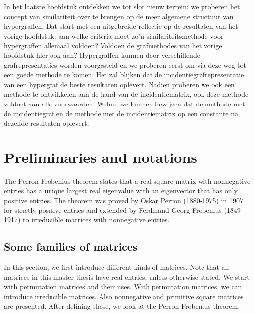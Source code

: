 \documentclass[a4paper,11pt]{report}
\begin{document}
In het laatste hoofdstuk ontdekken we tot slot nieuw terrein: we proberen 
het concept van similariteit over te brengen op de meer algemene 
structuur van hypergraffen. Dat start met een uitgebreide reflectie op de resultaten van het vorige hoofdstuk:
aan welke criteria moet zo'n similariteitsmethode voor hypergraffen allemaal voldoen? Voldoen de grafmethodes van het vorige
hoofdstuk hier ook aan? Hypergraffen kunnen door verschillende 
grafrepresentaties worden voorgesteld en we proberen eerst om via deze 
weg tot een goede methode te komen. Het zal blijken dat de incidentiegrafrepresentatie van een hypergraf de beste
resultaten oplevert. Nadien proberen 
we ook een methode te ontwikkelen aan de hand van de incidentiematrix, ook deze 
methode voldoet aan alle voorwaarden. Welnu: we kunnen bewijzen dat de methode 
met de incidentiegraf en de methode met de incidentiematrix op een constante na 
dezelfde resultaten oplevert.


 

\tableofcontents
\newpage
\chapter{Preliminaries and notations}


The Perron-Frobenius theorem states that a real square matrix with nonnegative entries has a unique largest real eigenvalue with an eigenvector 
that has only positive entries. The theorem was proved by Oskar 
Perron (1880-1975) in 1907 for strictly positive entries and extended by 
Ferdinand Georg Frobenius (1849-1917) to irreducible matrices with nonnegative 
entries. 

\section{Some families of matrices}
In this section, we first introduce different kinds of matrices. Note that all matrices in this master thesis have real entries,
unless otherwise stated. We start with permutation matrices and their uses. 
With permutation matrices, we can introduce irreducible matrices. Also nonnegative and primitive square matrices are presented. After defining 
those, we look at the Perron-Frobenius theorem. 
\end{document}
